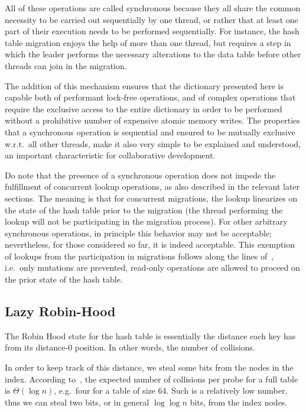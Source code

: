 All of these operations are called synchronous because they all share the common necessity to be carried out sequentially by one thread, or rather that at least one part of their execution needs to be performed sequentially.
For instance, the hash table migration enjoys the help of more than one thread, but requires a step in which the leader performs the necessary alterations to the data table before other threads can join in the migration.

The addition of this mechanism ensures that the dictionary presented here is capable both of performant lock-free operations, and of complex operations that require the exclusive access to the entire dictionary in order to be performed without a prohibitive number of expensive atomic memory writes.
The properties that a synchronous operation is sequential and ensured to be mutually exclusive w.r.t.\ all other threads, make it also very simple to be explained and understood, an important characteristic for collaborative development.

Do note that the presence of a synchronous operation does not impede the fulfillment of concurrent lookup operations, as also described in the relevant later sections.
The meaning is that for concurrent migrations, the lookup linearizes on the state of the hash table prior to the migration (the thread performing the lookup will not be participating in the migration process).
For other arbitrary synchronous operations, in principle this behavior may not be acceptable; nevertheless, for those considered so far, it is indeed acceptable.
This exemption of lookups from the participation in migrations follows along the lines of~\cite[\S5.3.2, Preventing Concurrent Updates to Ensure Consistency]{maier}, i.e.\ only mutations are prevented, read-only operations are allowed to proceed on the prior state of the hash table.


\subsection{Lazy Robin-Hood}\label{subsec:lazy-robin-hood}

The Robin Hood state for the hash table is essentially the distance each key has from its distance-0 position.
In other words, the number of collisions.

In order to keep track of this distance, we steal some bits from the nodes in the index.
According to~\cite[Corollary to Theorem~3]{robin-hood}, the expected number of collisions per probe for a full table is $\Theta(\log n)$, e.g.\ four for a table of size 64.
Such is a relatively low number, thus we can steal two bits, or in general $\log \log n$ bits, from the index nodes.

